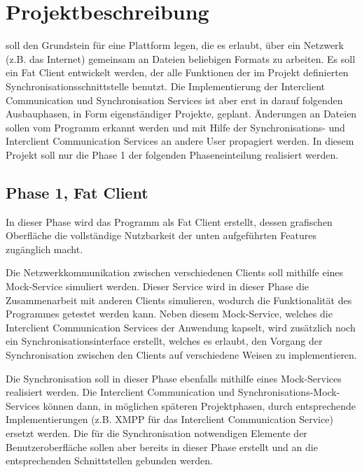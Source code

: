 
\section{Projektbeschreibung}

\sepmprojectname soll den Grundstein für eine Plattform legen, die es erlaubt, über ein Netzwerk (z.B. das Internet) gemeinsam an Dateien beliebigen Formats zu arbeiten. Es soll ein Fat Client entwickelt werden, der alle Funktionen der im Projekt definierten Synchronisationsschnittstelle benutzt. Die Implementierung der Interclient Communication und Synchronisation Services ist aber erst in darauf folgenden Ausbauphasen, in Form eigenständiger Projekte, geplant. Änderungen an Dateien sollen vom Programm erkannt werden und mit Hilfe der Synchronisations- und Interclient Communication Services an andere User propagiert werden. In diesem Projekt soll nur die Phase 1 der folgenden Phaseneinteilung realisiert werden.

\subsection{Phase 1, Fat Client}
In dieser Phase wird das Programm als Fat Client erstellt, dessen grafischen Oberfläche die vollständige Nutzbarkeit der unten aufgeführten Features zugänglich macht. 

Die Netzwerkkommunikation zwischen verschiedenen Clients soll mithilfe eines Mock-Service simuliert werden. Dieser Service wird in dieser Phase die Zusammenarbeit mit anderen Clients simulieren, wodurch die Funktionalität des Programmes getestet werden kann. Neben diesem Mock-Service, welches die Interclient Communication Services der Anwendung kapselt, wird zusätzlich noch ein Synchronisationsinterface erstellt, welches es erlaubt, den Vorgang der Synchronisation zwischen den Clients auf verschiedene Weisen zu implementieren.

Die Synchronisation soll in dieser Phase ebenfalls mithilfe eines Mock-Services realisiert werden. Die Interclient Communication und Synchronisations-Mock-Services können dann, in möglichen späteren Projektphasen, durch entsprechende Implementierungen (z.B. XMPP für das Interclient Communication Service) ersetzt werden. Die für die Synchronisation notwendigen Elemente der Benutzeroberfläche sollen aber bereits in dieser Phase erstellt und an die entsprechenden Schnittstellen gebunden werden. 

